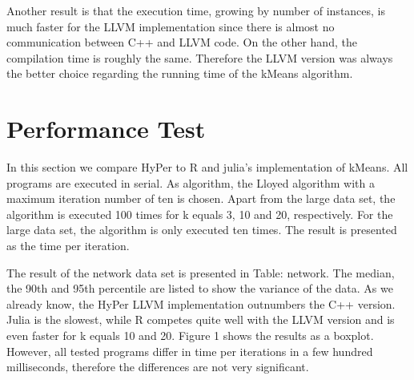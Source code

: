 Another result is that the execution time, growing by number of instances, is much faster for the LLVM implementation since there is almost no communication between C++ and LLVM code. On the other hand, the compilation time is roughly the same. Therefore the LLVM version was always the better choice regarding the running time of the kMeans algorithm.


\section{Performance Test}

In this section we compare HyPer to R and julia’s implementation of kMeans. All programs are executed in serial. As algorithm, the Lloyed algorithm with a maximum iteration number of ten is chosen. Apart from the large data set, the algorithm is executed 100 times for k equals 3, 10 and 20, respectively. For the large data set, the algorithm is only executed ten times. The result is presented as the time per iteration. 

The result of the network data set is presented in Table: network. The median, the 90th and 95th percentile are listed to show the variance of the data. As we already know, the HyPer LLVM implementation outnumbers  the C++ version. Julia is the slowest, while R competes quite well with the LLVM version and is even faster for k equals 10 and 20. Figure 1 shows the results as a boxplot.
However, all tested programs differ in time per iterations in a few hundred milliseconds, therefore the differences are not very significant.



